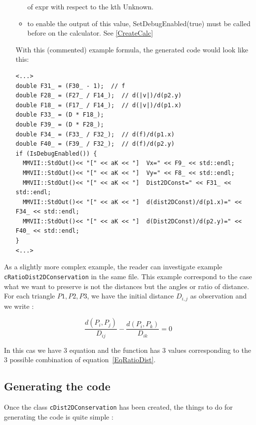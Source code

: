 \begin{itemize}
\begin{itemize}
               of expr with respect to the kth Unknown.
         \item to enable the output of this value, SetDebugEnabled(true) must be called
                before on the calculator. See \ref{CreateCalc}
   \end{itemize}
        With this (commented) example formula, the generated code would look like this:
        \begin{lstlisting}
<...>
double F31_ = (F30_ - 1);  // f
double F28_ = (F27_ / F14_);  // d(|v|)/d(p2.y)
double F18_ = (F17_ / F14_);  // d(|v|)/d(p1.x)
double F33_ = (D * F18_);
double F39_ = (D * F28_);
double F34_ = (F33_ / F32_);  // d(f)/d(p1.x)
double F40_ = (F39_ / F32_);  // d(f)/d(p2.y)
if (IsDebugEnabled()) {
  MMVII::StdOut()<< "[" << aK << "]  Vx=" << F9_ << std::endl;
  MMVII::StdOut()<< "[" << aK << "]  Vy=" << F8_ << std::endl;
  MMVII::StdOut()<< "[" << aK << "]  Dist2DConst=" << F31_ << std::endl;
  MMVII::StdOut()<< "[" << aK << "]  d(dist2DConst)/d(p1.x)=" << F34_ << std::endl;
  MMVII::StdOut()<< "[" << aK << "]  d(Dist2DConst)/d(p2.y)=" << F40_ << std::endl;
}
<...>
        \end{lstlisting}
\end{itemize}

As a slightly more complex example, the reader can investigate example {\tt cRatioDist2DConservation}
in the same file. This example correspond to the case what we want to preserve is not the distances
but the angles or ratio of distance. For each triangle $P1,P2,P3$, we have the initial 
distance $D_{i,j}$ as observation and  we write :

\begin{equation}
      \frac{d(P_i,P_j)}{D_{ij}} - \frac{d(P_i,P_k)}{D_{ik}} = 0 \label{EqRatioDist}
\end{equation}

In this cas we have $3$ equation and the function has $3$  values corresponding to the
$3$ possible combination of  equation~\ref{EqRatioDist}.


\subsection{Generating the code}

Once the class {\tt cDist2DConservation} has been created, the things to do for generating the
code is quite simple :

